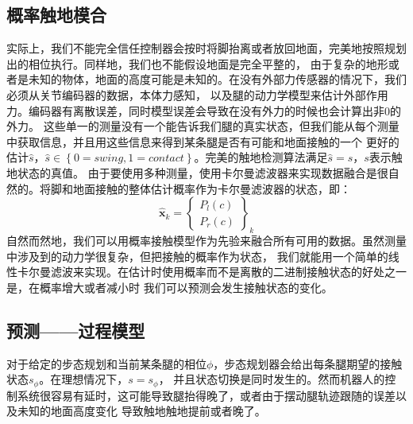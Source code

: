 \subsection{概率触地模合}
实际上，我们不能完全信任控制器会按时将脚抬离或者放回地面，完美地按照规划出的相位执行。同样地，我们也不能假设地面是完全平整的，
由于复杂的地形或者是未知的物体，地面的高度可能是未知的。在没有外部力传感器的情况下，我们必须从关节编码器的数据，本体力感知，
以及腿的动力学模型来估计外部作用力。编码器有离散误差，同时模型误差会导致在没有外力的时候也会计算出非0的外力。
这些单一的测量没有一个能告诉我们腿的真实状态，但我们能从每个测量中获取信息，并且用这些信息来得到某条腿是否有可能和地面接触的一个
更好的估计$\hat s$，$\hat s \in \left\{0=swing, 1=contact\right\}$。完美的触地检测算法满足$\hat s = s$，$s$表示触地状态的真值。
由于要使用多种测量，使用卡尔曼滤波器来实现数据融合是很自然的。将脚和地面接触的整体估计概率作为卡尔曼滤波器的状态，即：
\begin{equation}
    \label{equ:est_state}
    \hat{\boldsymbol{x}}_k=\left\{\begin{array}{c}
        P_l(c) \\
        P_r(c)
        \end{array}\right\}_k
\end{equation}
自然而然地，我们可以用概率接触模型作为先验来融合所有可用的数据。虽然测量中涉及到的动力学很复杂，但把接触的概率作为状态，
我们就能用一个简单的线性卡尔曼滤波来实现。在估计时使用概率而不是离散的二进制接触状态的好处之一是，在概率增大或者减小时
我们可以预测会发生接触状态的变化。
\subsection{预测——过程模型}

对于给定的步态规划和当前某条腿的相位$\phi$，步态规划器会给出每条腿期望的接触状态$s_{\phi}$。在理想情况下，$s = s_{\phi}$，
并且状态切换是同时发生的。然而机器人的控制系统很容易有延时，这可能导致腿抬得晚了，或者由于摆动腿轨迹跟随的误差以及未知的地面高度变化
导致触地触地提前或者晚了。

